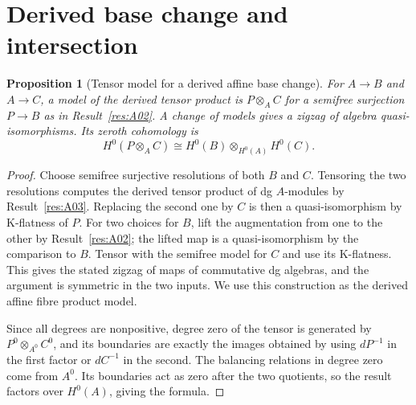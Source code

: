 \documentclass[11pt,oneside,openany]{book}
\newtheorem{proposition}[theorem]{Proposition}
\theoremstyle{definition}
\theoremstyle{remark}
\begin{document}
\section{Derived base change and intersection}

\begin{proposition}[Tensor model for a derived affine base change]\label{res:A04}
For \(A\to B\) and \(A\to C\), a model of the derived tensor product
is \(P\otimes_A C\) for a semifree surjection \(P\to B\) as in
Result~\ref{res:A02}. A change of models gives a zigzag of algebra
quasi-isomorphisms. Its zeroth cohomology is
\[
 H^0(P\otimes_A C)
   \cong H^0(B)\otimes_{H^0(A)} H^0(C).
\]
\end{proposition}
\begin{proof}
Choose semifree surjective resolutions of both \(B\) and \(C\).
Tensoring the two resolutions computes the derived tensor product of
dg \(A\)-modules by Result~\ref{res:A03}. Replacing the second one
by \(C\) is then a quasi-isomorphism by K-flatness of \(P\).
For two choices for \(B\), lift the augmentation from one to the
other by Result~\ref{res:A02}; the lifted map is a quasi-isomorphism
by the comparison to \(B\). Tensor with the semifree model for \(C\)
and use its K-flatness. This gives the stated zigzag of maps of
commutative dg algebras, and the argument is symmetric in the two
inputs. We use this construction as the derived affine fibre product
model.

Since all degrees are nonpositive, degree zero of the tensor is
generated by \(P^0\otimes_{A^0}C^0\), and its boundaries are exactly
the images obtained by using \(dP^{-1}\) in the first factor or
\(dC^{-1}\) in the second. The balancing relations in degree zero
come from \(A^0\). Its boundaries act as zero after the two
quotients, so the result factors over \(H^0(A)\), giving the formula.
\end{proof}
\end{document}

